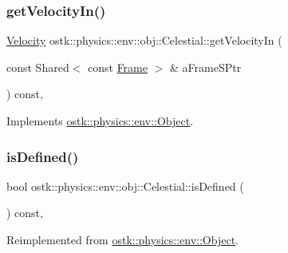 \mbox{\label{classostk_1_1physics_1_1env_1_1obj_1_1_celestial_a748a113566d79c463e84bf62f05af83a}} 
\subsubsection{\texorpdfstring{get\+Velocity\+In()}{getVelocityIn()}}
{\footnotesize\ttfamily \hyperlink{classostk_1_1physics_1_1coord_1_1_velocity}{Velocity} ostk\+::physics\+::env\+::obj\+::\+Celestial\+::get\+Velocity\+In (\begin{DoxyParamCaption}\item[{const Shared$<$ const \hyperlink{classostk_1_1physics_1_1coord_1_1_frame}{Frame} $>$ \&}]{a\+Frame\+S\+Ptr }\end{DoxyParamCaption}) const\hspace{0.3cm}{\ttfamily [override]}, {\ttfamily [virtual]}}



Implements \hyperlink{classostk_1_1physics_1_1env_1_1_object_a216c8d5e44451fd664e0c7eb3b4934b6}{ostk\+::physics\+::env\+::\+Object}.

\mbox{\label{classostk_1_1physics_1_1env_1_1obj_1_1_celestial_a611b8fe6fcd3787bbf9981ad99dfe471}} 
\subsubsection{\texorpdfstring{is\+Defined()}{isDefined()}}
{\footnotesize\ttfamily bool ostk\+::physics\+::env\+::obj\+::\+Celestial\+::is\+Defined (\begin{DoxyParamCaption}{ }\end{DoxyParamCaption}) const\hspace{0.3cm}{\ttfamily [override]}, {\ttfamily [virtual]}}



Reimplemented from \hyperlink{classostk_1_1physics_1_1env_1_1_object_aaa5131bafbaf86fde7f649e88343a901}{ostk\+::physics\+::env\+::\+Object}.

